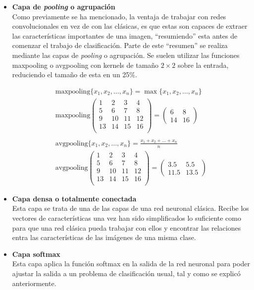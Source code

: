 \begin{itemize}
				\item \textbf{Capa de \textit{pooling} o agrupación}\\
				Como previamente se ha mencionado, la ventaja de trabajar con redes convolucionales en vez de con las clásicas, es que estas son capaces de extraer las características importantes de una imagen, ``resumiendo'' esta antes de comenzar el trabajo de clasificación. Parte de este ``resumen'' se realiza mediante las capas de \textit{pooling} o agrupación. Se suelen utilizar las funciones maxpooling o avgpooling con kernels de tamaño $2\times2$ sobre la entrada, reduciendo el tamaño de esta en un 25\%. 
				
				$$
				\begin{gathered}
					\text{maxpooling}\{x_1, x_2, \hdots, x_n\} = \max\{x_1, x_2, \hdots, x_n\}\\
					\text{maxpooling}\left(\begin{array}{cc|cc}
						1 & 2 & 3 & 4\\
						5 & \boxed{6} & 7 & \boxed{8}\\\hline
						9 & 10 & 11 & 12\\
						13 & \boxed{14} & 15 & \boxed{16}\\
					\end{array}\right) = \begin{pmatrix}
						6 & 8\\
						14 & 16
					\end{pmatrix}\\\\
					\text{avgpooling}\{x_1, x_2, \hdots, x_n\} = \frac{x_1 + x_2 + \hdots + x_n}{n}\\
					\text{avgpooling}\left(\begin{array}{cc|cc}
						1 & 2 & 3 & 4\\
						5 & 6 & 7 & 8\\\hline
						9 & 10 & 11 & 12\\
						13 & 14 & 15 & 16\\
					\end{array}\right) = \begin{pmatrix}
						3.5 & 5.5\\
						11.5 & 13.5
					\end{pmatrix}
				\end{gathered}
				$$
				
				\item \textbf{Capa densa o totalmente conectada}\\
				Esta capa se trata de una de las capas de una red neuronal clásica. Recibe los vectores de características una vez han sido simplificados lo suficiente como para que una red clásica pueda trabajar con ellos y encontrar las relaciones entra las características de las imágenes de una misma clase. 
				
				\item \textbf{Capa softmax}\\
				Esta capa aplica la función softmax en la salida de la red neuronal para poder ajustar la salida a un problema de clasificación usual, tal y como se explicó anteriormente. 
			\end{itemize}
			
